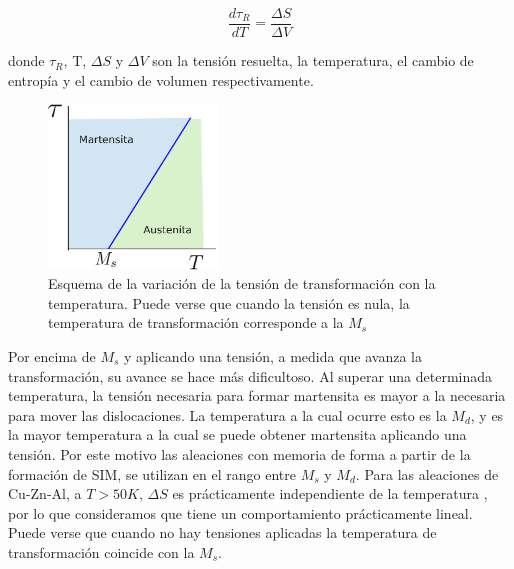 \documentclass[a4paper,12pt,fleqn,twoside,openany]{book}
\begin{document}
\begin{equation}
 \frac{d \tau_{R}}{dT}=\frac{\Delta S}{\Delta V} 
\end{equation}

donde $\tau_{R}$, T, $\Delta S$ y $\Delta V$ son la tensión resuelta, la temperatura, el cambio de entropía y el cambio de volumen respectivamente.






\begin{figure}[h]
 \centering
 \includegraphics[width=0.4\textwidth]{Img/Introduccion/Clapeyron.eps}
 \caption{Esquema de la variación de la tensión de transformación con la temperatura. Puede verse que cuando la tensión es nula, la temperatura de
 transformación corresponde a la $M_s$}
\end{figure}






Por encima de $M_s$ y aplicando una tensión, a medida que avanza la transformación, su avance se hace más dificultoso. Al superar una determinada temperatura, la tensión necesaria para 
formar martensita es mayor a la necesaria para mover las dislocaciones. La temperatura a la cual ocurre esto es la $M_d$, y es la mayor temperatura a la cual se puede 
obtener martensita aplicando una tensión. Por este motivo las aleaciones con memoria de forma a partir de la formación de SIM, se utilizan en el rango entre $M_s$ y $M_d$.
Para las aleaciones de Cu-Zn-Al, a $T > 50K$, $\Delta S$ es prácticamente independiente de la temperatura \cite{pierre}, por lo que consideramos que tiene un comportamiento 
prácticamente lineal. Puede verse que cuando no hay tensiones aplicadas la temperatura de transformación coincide con la $M_s$.
\end{document}
